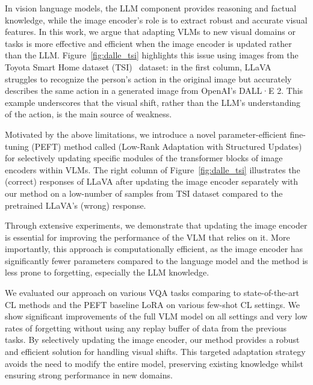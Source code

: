 In vision language models, the LLM component provides reasoning and factual knowledge, while the image encoder's role is to extract robust and accurate visual features. In this work, we argue that adapting VLMs to new visual domains or tasks is more effective and efficient when the image encoder is updated rather than the LLM. Figure~\ref{fig:dalle_tsi} highlights this issue using images from the Toyota Smart Home dataset (TSI)~\cite{das2019toyota} dataset: in the first column, LLaVA~\cite{liu2024llava} struggles to recognize the person's action in the original image but accurately describes the same action in a generated image from OpenAI's DALL·E 2. This example underscores that the visual shift, rather than the LLM's understanding of the action, is the main source of weakness.

Motivated by the above limitations, we introduce a novel parameter-efficient fine-tuning (PEFT) method called \ours (Low-Rank Adaptation with Structured Updates) for selectively updating specific modules of the transformer blocks of image encoders within VLMs. The right column of Figure~\ref{fig:dalle_tsi} 
illustrates the (correct) responses of LLaVA after updating the image encoder separately with our method on a low-number of samples from TSI dataset compared to the pretrained LLaVA's (wrong) response.

Through extensive experiments, we demonstrate that updating the image encoder is essential for improving the performance of the VLM that relies on it. More importantly, this approach is computationally efficient, as the image encoder has significantly fewer parameters compared to the language model and the method is less prone to forgetting, especially the LLM knowledge.

We evaluated our approach on various VQA tasks comparing to state-of-the-art CL methods and the PEFT baseline LoRA\cite{hu2021lora} on various few-shot CL settings. We show significant improvements of the full VLM model on all settings and very low rates of forgetting  without using any replay buffer of data from the previous tasks. By selectively updating the image encoder, our method provides a robust and efficient solution for handling visual shifts. This targeted adaptation strategy avoids the need to modify the entire model, preserving existing knowledge whilst ensuring strong performance in new domains.


